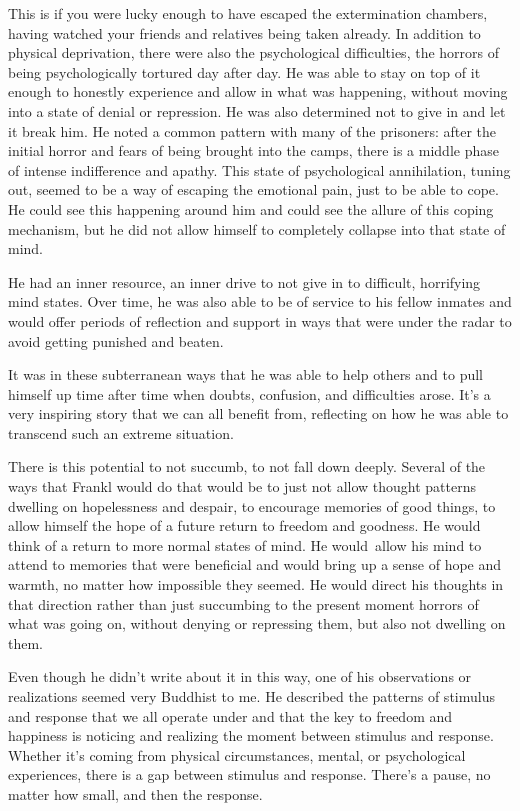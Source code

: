 This is if you were lucky enough to have escaped the extermination chambers, having watched your friends and relatives being taken already. In addition to physical deprivation, there were also the psychological difficulties, the horrors of being psychologically tortured day after day. He was able to stay on top of it enough to honestly experience and allow in what was happening, without moving into a state of denial or repression. He was also determined not to give in and let it break him. He noted a common pattern with many of the prisoners: after the initial horror and fears of being brought into the camps, there is a middle phase of intense indifference and apathy. This state of psychological annihilation, tuning out, seemed to be a way of escaping the emotional pain, just to be able to cope. He could see this happening around him and could see the allure of this coping mechanism, but he did not allow himself to completely collapse into that state of mind.

He had an inner resource, an inner drive to not give in to difficult, horrifying mind states. Over time, he was also able to be of service to his fellow inmates and would offer periods of reflection and support in ways that were under the radar to avoid getting punished and beaten.

It was in these subterranean ways that he was able to help others and to pull himself up time after time when doubts, confusion, and difficulties arose. It's a very inspiring story that we can all benefit from, reflecting on how he was able to transcend such an extreme situation.

There is this potential to not succumb, to not fall down deeply. Several of the ways that Frankl would do that would be to just not allow thought patterns dwelling on hopelessness and despair, to encourage memories of good things, to allow himself the hope of a future return to freedom and goodness. He would think of a return to more normal states of mind. He \mbox{would allow} his mind to attend to memories that were beneficial and would bring up a sense of hope and warmth, no matter how impossible they seemed. He would direct his thoughts in that direction rather than just succumbing to the present moment horrors of what was going on, without denying or repressing them, but also not dwelling on them.

Even though he didn't write about it in this way, one of his observations or realizations seemed very Buddhist to me. He described the patterns of stimulus and response that we all operate under and that the key to freedom and happiness is noticing and realizing the moment between stimulus and response. Whether it's coming from physical circumstances, mental, or psychological experiences, there is a gap between stimulus and response. There's a pause, no matter how small, and then the response.

